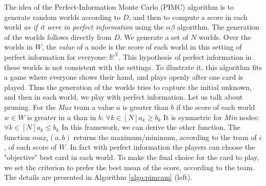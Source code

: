 \documentclass[runningheads]{llncs}
\begin{document}
The idea of the Perfect-Information Monte Carlo (PIMC) algorithm is to generate random worlds according to $D$, and then  to compute a score in each world \emph{as if it were in perfect information} using the $\alpha\beta$ algorithm. 
The generation of the worlds follows directly from $D$. We generate 
a set of $N$ worlds.
Over the worlds in $W$, the \emph{value} of a node is the score of each world in this setting of perfect information for everyone: $\mathbb{R}^N $. This hypothesis of perfect information in these worlds is not consistent with the settings. To illustrate it, this algorithm fits a game where everyone shows their hand, and plays openly after one card is played. Thus the generation of the worlds tries to capture the initial unknown, and then in each world, we play with perfect information.
Let us talk about pruning. For the \emph{Max} team a value $a$ is greater than $b$ if the score of each world $w \in W$ is greater in $a$ than in $b$:
$ \forall k \in [N] a_k \geq b_k $
It is symmetric for \emph{Min} nodes:
$ \forall k \in [N] a_k \leq b_k $ 
In this framework, we can derive the other function. The function $max_i(a,b)$ returns the maximum/minimum, according to the team of $i$, of each score of $W$. In fact with perfect information the players can choose the "objective" best card in each world. To make the final choice for the card to play, we set the criterion to prefer the best mean of the score, according to the team. The details are presented in Algorithm \ref{algo:pimcam} (left).

\newlength\myindent
\setlength\myindent{-2em}
\newcommand\bindent{%
  \begingroup
  \setlength{\itemindent}{\myindent}
  \addtolength{\algorithmicindent}{\myindent}
}
\newcommand\eindent{\endgroup}
\end{document}
